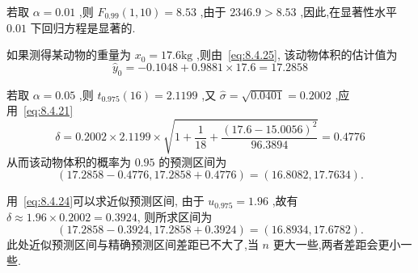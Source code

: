 \begin{example}
  \noindent 若取 $\alpha=0.01$ ,则 $F_{0.99}(1,10)=8.53$ ,由于 $2346.9>8.53$ ,因此,在显著性水平 $0.01$ 下回归方程是显著的.
    
    如果测得某动物的重量为 $x_0=17.6\si{\kilogram}$ ,则由~\eqref{eq:8.4.25}, 该动物体积的估计值为
    \begin{equation*}
    \hat{y}_{0}=-0.1048+0.9881 \times 17.6=17.2858
    \end{equation*}
    
    若取 $\alpha=0.05$ ,则 $t_{0.975}(16)=2.1199$ ,又 $\hat{\sigma}=\sqrt{0.0401}=0.2002$ ,应用~\eqref{eq:8.4.21}
    \begin{equation*}
    \delta=0.2002 \times 2.1199 \times \sqrt{1+\frac{1}{18}+\frac{(17.6-15.0056)^{2}}{96.3894}}=0.4776
    \end{equation*}
    从而该动物体积的概率为 $0.95$ 的预测区间为
    \begin{equation*}
      (17.2858 - 0.4776, 17.2858 + 0.4776)=(16.8082, 17.7634).
    \end{equation*}

    用~\eqref{eq:8.4.24}可以求近似预测区间, 由于 $u_{0.975}=1.96$ ,故有 $\delta \approx 1.96\times 0.2002=0.3924$, 则所求区间为
    \begin{equation*}
    (17.2858 - 0.392 4, 17.2858 + 0.3924)=(16.8934,17.6782).
    \end{equation*}
    此处近似预测区间与精确预测区间差距已不大了,当 $n$ 更大一些,两者差距会更小一些.
\end{example}

